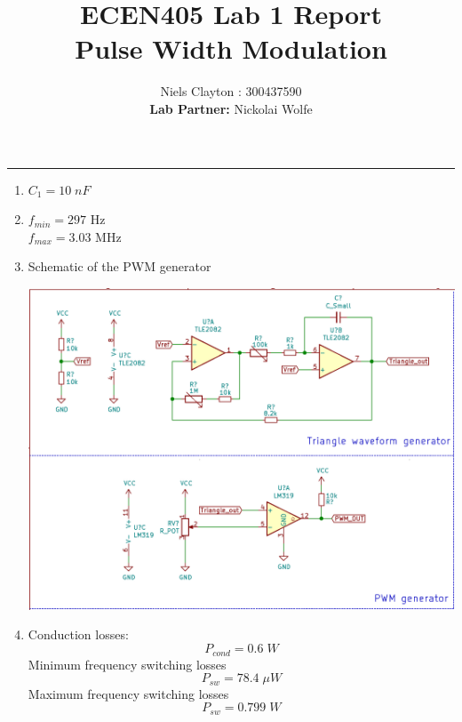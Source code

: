 \documentclass[a4paper,11pt]{article}
\begin{document}
\begin{preview}
\title{\LARGE{\textbf{ECEN405 Lab 1 Report\\Pulse Width Modulation}}}
\author{Niels Clayton : 300437590\\\textbf{Lab Partner:} Nickolai Wolfe}
\date{}
\maketitle
\hrule

\begin{enumerate}
    \item 
    $C_1 = 10\;nF$\\
    
    \item 
    $f_{min} = 297$ Hz\\$f_{max} = 3.03$ MHz\\
    
    \item 
    Schematic of the PWM generator
    \begin{center}
        \includegraphics[width = \textwidth]{schematic_1.png}
    \end{center}
    \vspace{20pt}

    \item 
    Conduction losses: $$P_{cond} = 0.6\;W $$
    Minimum frequency switching losses $$P_{sw}= 78.4 \;\mu W$$
    Maximum frequency switching losses $$P_{sw}= 0.799 \; W$$\\
    

\end{enumerate}
\end{preview}
\end{document}
